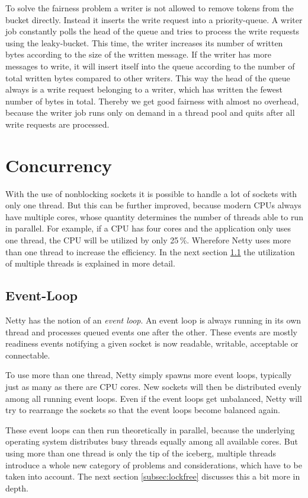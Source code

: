 To solve the fairness problem a writer is not allowed to remove tokens from the bucket directly. Instead it inserts the write request into a priority-queue. A writer job constantly polls the head of the queue and tries to process the write requests using the leaky-bucket. This time, the writer increases its number of written bytes according to the size of the written message. If the writer has more messages to write, it will insert itself into the queue according to the number of total written bytes compared to other writers. This way the head of the queue always is a write request belonging to a writer, which has written the fewest number of bytes in total. Thereby we get good fairness with almost no overhead, because the writer job runs only on demand in a thread pool and quits after all write requests are processed.

\cleardoublepage
\section{Concurrency}
With the use of nonblocking sockets it is possible to handle a lot of sockets with only one thread. But this can be further improved, because modern CPUs always have multiple cores, whose quantity determines the number of threads able to run in parallel. For example, if a CPU has four cores and the application only uses one thread, the CPU will be utilized by only 25\,\%. Wherefore Netty uses more than one thread to increase the efficiency. In the next section \ref{subsec:eventloop} the utilization of multiple threads is explained in more detail.

\subsection{Event-Loop}
\label{subsec:eventloop}
Netty has the notion of an \emph{event loop}. An event loop is always running in its own thread and processes queued events one after the other. These events are mostly readiness events notifying a given socket is now readable, writable, acceptable or connectable.

To use more than one thread, Netty simply spawns more event loops, typically just as many as there are CPU cores. New sockets will then be distributed evenly among all running event loops. Even if the event loops get unbalanced, Netty will try to rearrange the sockets so that the event loops become balanced again.

These event loops can then run theoretically in parallel, because the underlying operating system distributes busy threads equally among all available cores. But using more than one thread is only the tip of the iceberg, multiple threads introduce a whole new category of problems and considerations, which have to be taken into account. The next section \ref{subsec:lockfree} discusses this a bit more in depth.


